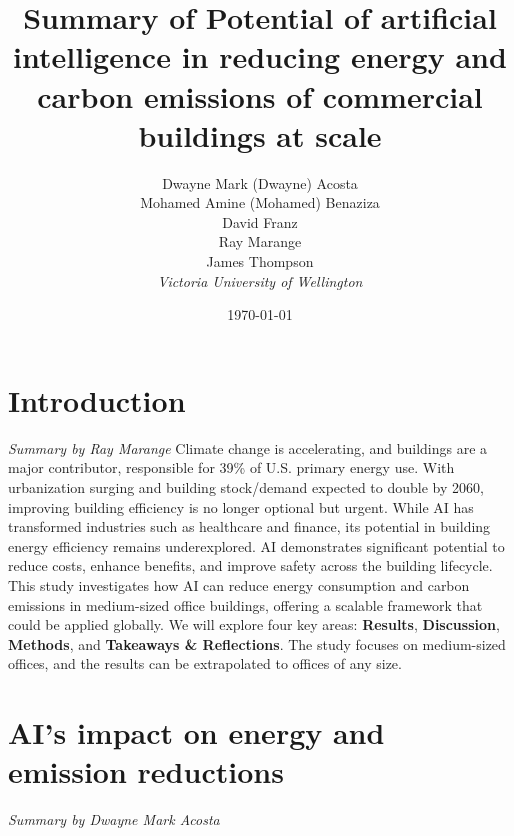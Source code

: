 \documentclass[conference,a4paper]{IEEEtran}
\begin{document}
\newcommand{\cfigure}[2]{%
  \begin{figure}[h]
    \centering
    \texttt{[image: figures/\#1.png]}%
    \caption{#2}%
    \label{fig:#1}%
  \end{figure}%

}
\title{Summary of Potential of artificial intelligence in reducing energy and carbon emissions of commercial buildings at scale}

\author{Dwayne Mark (Dwayne) Acosta \\ Mohamed Amine (Mohamed) Benaziza \\ David Franz \\ Ray Marange \\ James Thompson\\
\textit{Victoria University of Wellington}\\}
\date{\today}

\maketitle

\section*{Introduction}
\textit{Summary by Ray Marange}
Climate change is accelerating, and buildings are a major contributor, responsible for 39\% of U.S. primary energy use. With urbanization surging and building stock/demand expected to double by 2060, improving building efficiency is no longer optional but urgent.
While AI has transformed industries such as healthcare and finance, its potential in building energy efficiency remains underexplored. AI demonstrates significant potential to reduce costs, enhance benefits, and improve safety across the building lifecycle. This study \cite{dingPotentialArtificialIntelligence2024} investigates how AI can reduce energy consumption and carbon emissions in medium-sized office buildings, offering a scalable framework that could be applied globally.
We will explore four key areas: \textbf{Results}, \textbf{Discussion}, \textbf{Methods}, and \textbf{Takeaways \& Reflections}. The study focuses on medium-sized offices, and the results can be extrapolated to offices of any size.


\section*{AI's impact on energy and emission reductions}
\textit{Summary by Dwayne Mark Acosta}
\end{document}
